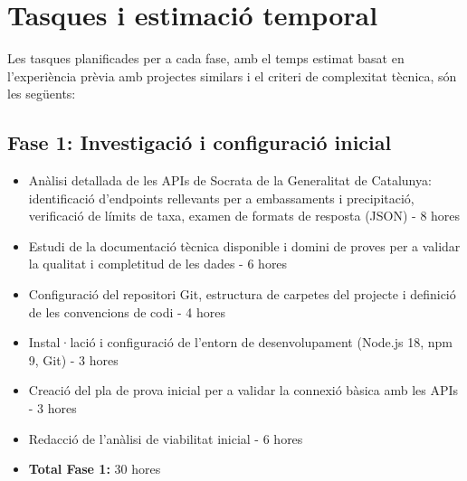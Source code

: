 
\section{Tasques i estimació temporal}

Les tasques planificades per a cada fase, amb el temps estimat basat en l'experiència prèvia amb projectes similars i el criteri de complexitat tècnica, són les següents:

\subsection{Fase 1: Investigació i configuració inicial}
\begin{itemize}
    \item Anàlisi detallada de les APIs de Socrata de la Generalitat de Catalunya: identificació d'endpoints rellevants per a embassaments i precipitació, verificació de límits de taxa, examen de formats de resposta (JSON) - 8 hores
    \item Estudi de la documentació tècnica disponible i domini de proves per a validar la qualitat i completitud de les dades - 6 hores
    \item Configuració del repositori Git, estructura de carpetes del projecte i definició de les convencions de codi - 4 hores
    \item Instal·lació i configuració de l'entorn de desenvolupament (Node.js 18, npm 9, Git) - 3 hores
    \item Creació del pla de prova inicial per a validar la connexió bàsica amb les APIs - 3 hores
    \item Redacció de l'anàlisi de viabilitat inicial - 6 hores
    \item \textbf{Total Fase 1:} 30 hores
\end{itemize}

